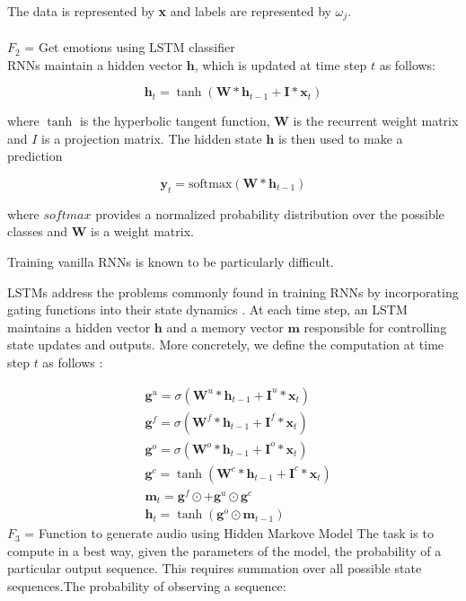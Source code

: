 \documentclass[oneside,a4paper,12pt]{book}
\def\x{{\mathbf x}}
\begin{document}
The data is represented by \textbf{x} and labels are represented by $\omega_j$.\\\\
$F_{2}$ = Get emotions using LSTM classifier\\
RNNs maintain a hidden vector $\mathbf h$, which is updated at time step $t$ as follows:

\begin{equation}
\mathbf h_t = \tanh(\mathbf W * \mathbf h_{t-1} + \mathbf I * \x_t)
\end{equation}

where $\tanh$ is the hyperbolic tangent function, $\mathbf W$ is the recurrent weight matrix and $I$ is a projection matrix. The hidden state $\mathbf h$ is then used to make a prediction

\begin{equation}
\mathbf y_t = \text{softmax}(\mathbf W * \mathbf h_{t-1})
\end{equation}

where $\textit{softmax}$ provides a normalized probability distribution over the possible classes and $\mathbf W$ is a weight matrix.


Training vanilla RNNs is known to be particularly difficult.

LSTMs address the problems commonly found in training RNNs by incorporating gating functions into their state dynamics . At each time step, an LSTM maintains a hidden vector $\mathbf h$ and a memory vector $\mathbf m$  responsible for controlling state updates and outputs. More concretely, we define the computation at time step $t$ as follows :

\begin{equation}
\begin{split}
& \mathbf g^u = \sigma(\mathbf W^u * \mathbf h_{t-1} + \mathbf I^u * \x_t) \\
& \mathbf g^f = \sigma(\mathbf W^f * \mathbf h_{t-1} + \mathbf I^f * \x_t) \\
& \mathbf g^o = \sigma(\mathbf W^o * \mathbf h_{t-1} + \mathbf I^o * \x_t) \\
& \mathbf g^c = \tanh(\mathbf W^c * \mathbf h_{t-1} + \mathbf I^c * \x_t) \\
& \mathbf m_t = \mathbf g^f \odot \mathbf +  \mathbf g^u \odot \mathbf g^c \\
& \mathbf h_t = \tanh(\mathbf g^o \odot \mathbf m_{t-1}) 
\end{split}
\end{equation}
$F_{3}$ = Function to generate audio using Hidden Markove Model
The task is to compute in a best way, given the parameters of the model, the probability of a particular output sequence. This requires summation over all possible state sequences.The probability of observing a sequence:\
\end{document}
